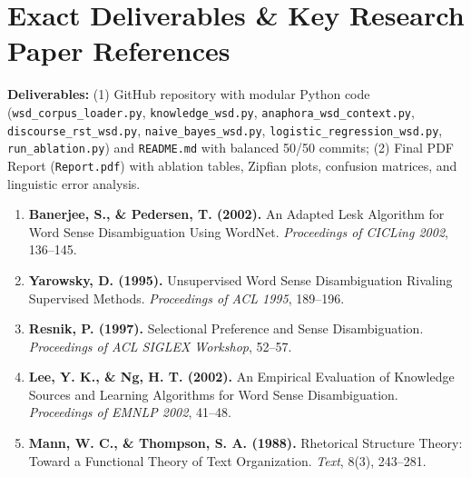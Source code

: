 \documentclass[11pt,a4paper]{article}
\begin{document}
\section{Exact Deliverables \& Key Research Paper References}
\textbf{Deliverables:} (1) GitHub repository with modular Python code (\texttt{wsd\_corpus\_loader.py}, \texttt{knowledge\_wsd.py}, \texttt{anaphora\_wsd\_context.py}, \texttt{discourse\_rst\_wsd.py}, \texttt{naive\_bayes\_wsd.py}, \texttt{logistic\_regression\_wsd.py}, \texttt{run\_ablation.py}) and \texttt{README.md} with balanced 50/50 commits; (2) Final PDF Report (\texttt{Report.pdf}) with ablation tables, Zipfian plots, confusion matrices, and linguistic error analysis.
\begin{enumerate}
    \item \textbf{Banerjee, S., \& Pedersen, T. (2002).} An Adapted Lesk Algorithm for Word Sense Disambiguation Using WordNet. \textit{Proceedings of CICLing 2002}, 136--145.
    \item \textbf{Yarowsky, D. (1995).} Unsupervised Word Sense Disambiguation Rivaling Supervised Methods. \textit{Proceedings of ACL 1995}, 189--196.
    \item \textbf{Resnik, P. (1997).} Selectional Preference and Sense Disambiguation. \textit{Proceedings of ACL SIGLEX Workshop}, 52--57.
    \item \textbf{Lee, Y. K., \& Ng, H. T. (2002).} An Empirical Evaluation of Knowledge Sources and Learning Algorithms for Word Sense Disambiguation. \textit{Proceedings of EMNLP 2002}, 41--48.
    \item \textbf{Mann, W. C., \& Thompson, S. A. (1988).} Rhetorical Structure Theory: Toward a Functional Theory of Text Organization. \textit{Text}, 8(3), 243--281.
\end{enumerate}
\end{document}
